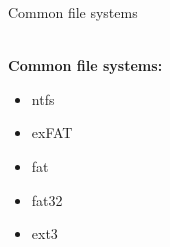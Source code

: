 \begin{frame}[t]{Common file systems}

  \hspace*{.6in}
  \begin{minipage}{3.5in}
	\vspace*{.3in}
	\\\textbf{Common file systems:}
	\begin{itemize}
	\renewcommand{\labelitemi}{$\bullet$}
		\item ntfs
		\item exFAT
		\item fat
		\item fat32
		\item ext3
	\end{itemize}
  
  \end{minipage}

\end{frame}